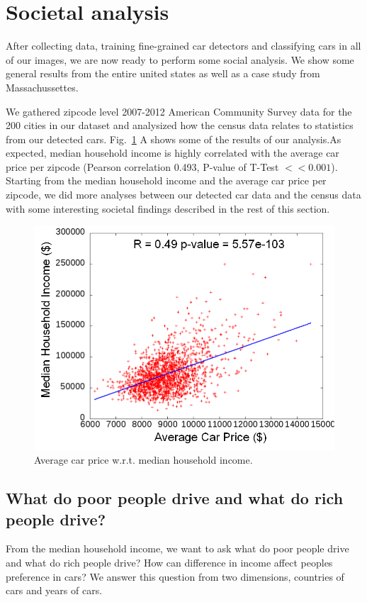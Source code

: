 \documentclass[10pt,twocolumn,letterpaper]{article}
\begin{document}
\section{Societal analysis}
After collecting data, training fine-grained car detectors and classifying cars in all of our images, we are now ready to perform some social analysis. We show some general results from the entire united states as well as a case study from Massachussettes.

We gathered zipcode level 2007-2012 American Community Survey data for the 200 cities in our dataset and analysized how the census data relates to statistics from our detected cars. Fig.~\ref{fig:corrs} A shows some of the results of our analysis.As expected, median household income is highly correlated with the average car price per zipcode (Pearson correlation 0.493, P-value of T-Test $<< 0.001$). Starting from the median household income and the average car price per zipcode, we did more analyses between our detected car data and the census data with some interesting societal findings described in the rest of this section.
\begin{figure}[t]
\begin{center}
   \includegraphics[width=0.8\linewidth]{img/averagePriceIncome.png}
\end{center}
   \caption {Average car price w.r.t. median household income.}
\label{fig:corrs}
\end{figure}

\subsection{What do poor people drive and what do rich people drive?}
From the median household income, we want to ask what do poor people drive and what do rich people drive? How can difference in income affect peoples preference in cars? We answer this question from two dimensions, countries of cars and years of cars.
\end{document}
